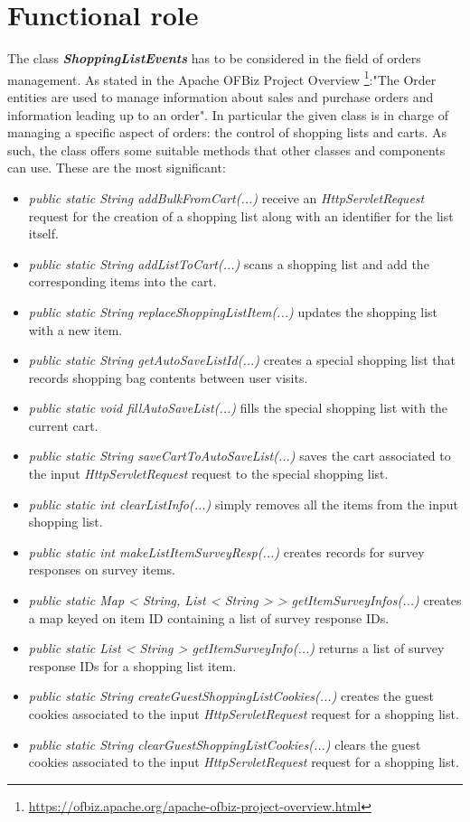 \documentclass[11pt,a4paper]{report}
\begin{document}
\section{Functional role}
The class \textbf{\textit{ShoppingListEvents}} has to be considered in the field of orders management. As stated in the Apache OFBiz\textsuperscript{\textregistered} Project Overview \footnote{\url{https://ofbiz.apache.org/apache-ofbiz-project-overview.html}}:"The Order entities are used to manage information about sales and purchase orders and information leading up to an order". In particular the given class is in charge of managing a specific aspect of orders: the control of shopping lists and carts. As such, the class offers some suitable methods that other classes and components can use. These are the most significant:
\begin{itemize}
	\item \textit{public static String addBulkFromCart(...)} receive an \textit{HttpServletRequest} request for the creation of a shopping list along with an identifier for the list itself.
	\item \textit{public static String addListToCart(...)} scans a shopping list and add the corresponding items into the cart.
	\item \textit{public static String replaceShoppingListItem(...)} updates the shopping list with a new item.
	\item \textit{public static String getAutoSaveListId(...)} creates a special shopping list that records shopping bag contents between user visits.
	\item \textit{public static void fillAutoSaveList(...)} fills the special shopping list with the current cart.
	\item \textit{public static String saveCartToAutoSaveList(...)} saves the cart associated to the input \textit{HttpServletRequest} request to the special shopping list.
	\item \textit{public static int clearListInfo(...)} simply removes all the items from the input shopping list.
	\item \textit{public static int makeListItemSurveyResp(...)} creates records for survey responses on survey items.
	\item \textit{public static Map < String, List < String > > getItemSurveyInfos(...)} creates a  map keyed on item ID containing a list of survey response IDs.
	\item \textit{public static List < String > getItemSurveyInfo(...)} returns a list of survey response IDs for a shopping list item.
	\item \textit{public static String createGuestShoppingListCookies(...)} creates the guest cookies associated to the input \textit{HttpServletRequest} request for a shopping list.
	\item \textit{public static String clearGuestShoppingListCookies(...)} clears the guest cookies associated to the input \textit{HttpServletRequest} request for a shopping list. 
\end{itemize}
\end{document}
